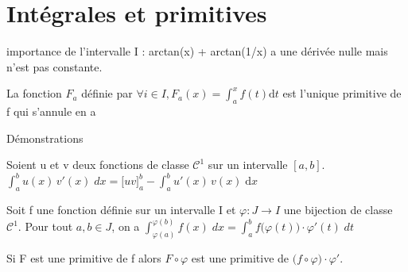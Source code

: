 \documentclass[french]{yLectureNote}
\newcommand{\R}[0]{\mathbb{R}}
\newcommand{\dd}[0]{\mathrm{d}}
\begin{document}
\section{Intégrales et primitives}
importance de l'intervalle I : arctan(x) + arctan(1/x) a une dérivée nulle mais n'est pas constante.
\begin{theorem}
 La fonction \(F_a\) définie par \(\forall i\in I, F_a(x) = \int^x_af(t)\dd t\) est l'unique primitive de f qui s'annule en a
\end{theorem}
Démonstrations
%
%
%
\begin{theorem}
Soient u et v deux fonctions de classe \(\mathcal{C}^1\) sur un intervalle \([a,b]\).
\(\displaystyle\int_a^b u(x) \, v'(x)\;dx= \big[uv\big]_a^b - \int_a^b u'(x) \, v(x)\;\dd x\)
\end{theorem}
\begin{theorem}
Soit f une fonction définie sur un intervalle I et \(\varphi : J \to I\) une bijection de classe \(\mathcal{C}^1\).
Pour tout \(a,b\in J\), on a
\(\displaystyle\int_{\varphi(a)}^{\varphi(b)} f(x) \; dx = \int_a^b f\big(\varphi(t)\big)\cdot\varphi'(t) \; dt\)

Si F est une primitive de f alors \(F\circ \varphi\) est une primitive de
\(\big(f \circ \varphi\big)\cdot\varphi'\).
\end{theorem}
\end{document}
